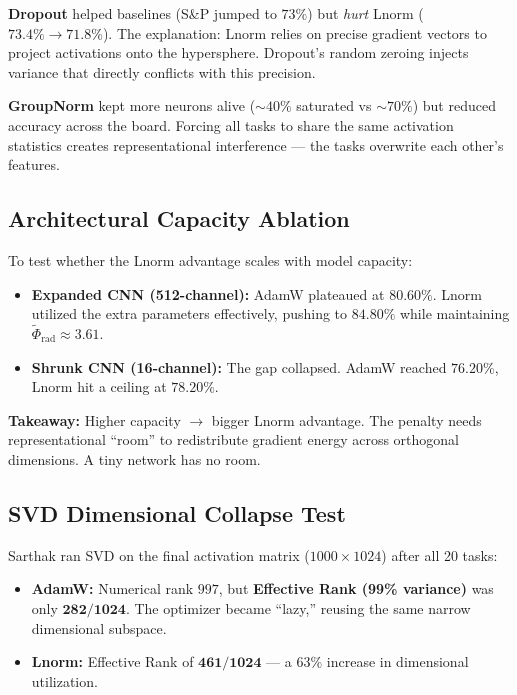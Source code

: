 \documentclass[11pt,a4paper]{article}
\begin{document}
\textbf{Dropout} helped baselines (S\&P jumped to $73\%$) but \emph{hurt} Lnorm ($73.4\% \to 71.8\%$). The explanation: Lnorm relies on precise gradient vectors to project activations onto the hypersphere. Dropout's random zeroing injects variance that directly conflicts with this precision.

\textbf{GroupNorm} kept more neurons alive ($\sim40\%$ saturated vs $\sim70\%$) but reduced accuracy across the board. Forcing all tasks to share the same activation statistics creates representational interference --- the tasks overwrite each other's features.

\subsection{Architectural Capacity Ablation}

To test whether the Lnorm advantage scales with model capacity:

\begin{itemize}
    \item \textbf{Expanded CNN (512-channel):} AdamW plateaued at $80.60\%$. Lnorm utilized the extra parameters effectively, pushing to $\mathbf{84.80\%}$ while maintaining $\tilde{\Phi}_{\text{rad}} \approx 3.61$.
    \item \textbf{Shrunk CNN (16-channel):} The gap collapsed. AdamW reached $76.20\%$, Lnorm hit a ceiling at $78.20\%$.
\end{itemize}

\textbf{Takeaway:} Higher capacity $\to$ bigger Lnorm advantage. The penalty needs representational ``room'' to redistribute gradient energy across orthogonal dimensions. A tiny network has no room.

\subsection{SVD Dimensional Collapse Test}

Sarthak ran SVD on the final activation matrix ($1000 \times 1024$) after all 20 tasks:

\begin{itemize}
    \item \textbf{AdamW:} Numerical rank $997$, but \textbf{Effective Rank (99\% variance)} was only $\mathbf{282 / 1024}$. The optimizer became ``lazy,'' reusing the same narrow dimensional subspace.
    \item \textbf{Lnorm:} Effective Rank of $\mathbf{461 / 1024}$ --- a $63\%$ increase in dimensional utilization.
\end{itemize}
\end{document}
